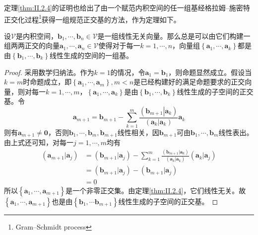 \documentclass[../main.tex]{subfiles}
\begin{document}
定理\ref{thm:II.2.4}的证明也给出了由一个赋范内积空间的任一组基经格拉姆--施密特正交化过程\footnote{Gram--Schmidt process}获得一组规范正交基的方法，作为定理如下。

\begin{theorem}\label{thm:II.2.5}
    设$\mathcal{V}$是内积空间，$\mathbf{b}_1,\cdots,\mathbf{b}_n\in\mathcal{V}$是一组线性无关向量。那么总是可以由它们构建一组两两正交的向量$\mathbf{a}_1,\cdots,\mathbf{a}_n\in\mathcal{V}$使得对于每一$k=1,\cdots,n$，向量组$\left\{\mathbf{a}_1,\cdots,\mathbf{a}_k\right\}$都是由$\left\{\mathbf{b}_1,\cdots,\mathbf{b}_k\right\}$线性生成的空间的一组基。
\end{theorem}
\begin{proof}
    采用数学归纳法。作为$k=1$的情况，令$\mathbf{a}_1=\mathbf{b}_1$，则命题显然成立。假设当$k=m$时命题成立，即$\left\{\mathbf{a}_1,\cdots,\mathbf{a}_m\right\},m<n$是已经构建好的满足命题要求的正交向量，则对每一$k=1,\cdots,m$，$\left\{\mathbf{a}_1,\cdots,\mathbf{a}_k\right\}$是由$\left\{\mathbf{b}_1,\cdots,\mathbf{b}_k\right\}$线性生成的子空间的正交基。令
    \[
        \mathbf{a}_{m+1}=\mathbf{b}_{m+1}-\sum_{k=1}^m\frac{\left(\left.\mathbf{b}_{m+1}\right|\left.\mathbf{a}_k\right.\right)}{\left(\mathbf{a}_k|\mathbf{a}_k\right)}\mathbf{a}_k
    \]
    则有$\mathbf{a}_{m+1}\neq\mathbf{0}$，否则$\mathbf{b}_1,\cdots,\mathbf{b}_m,\mathbf{b}_{m+1}$线性相关，因$\mathbf{b}_{m+1}$可由$\mathbf{b}_1,\cdots,\mathbf{b}_m$线性表出。由上式还可知，对每一$j=1,\cdots,m$均有
    \begin{align*}
        \left(\mathbf{a}_{m+1}|\mathbf{a}_j\right) & =\left(\mathbf{b}_{m+1}|\mathbf{a}_j\right)-\sum_{k=1}^m\frac{\left(\mathbf{b}_{m+1}|\mathbf{a}_k\right)}{\left(\mathbf{a}_k|\mathbf{a}_k\right)}\left(\mathbf{a}_k|\mathbf{a}_j\right) \\
                                                   & =\left(\mathbf{b}_{m+1}|\mathbf{a}_j\right)-\left(\mathbf{b}_{m+1}|\mathbf{a}_j\right)                                                                                                  \\
                                                   & =0
    \end{align*}
    所以$\left\{\mathbf{a}_1,\cdots,\mathbf{a}_{m+1}\right\}$是一个非零正交集。由定理\ref{thm:II.2.4}，它们线性无关。故$\left\{\mathbf{a}_1,\cdots,\mathbf{a}_{m+1}\right\}$也是由$\left\{\mathbf{b}_1,\cdots\mathbf{b}_{m+1}\right\}$线性生成的子空间的正交基。
\end{proof}
\end{document}
